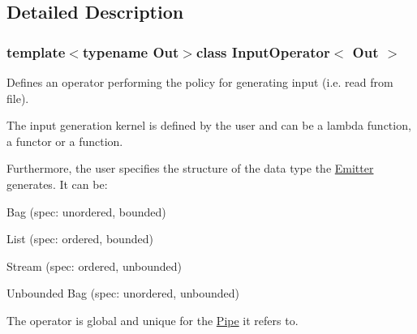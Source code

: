 \subsection{\-Detailed \-Description}
\subsubsection*{template$<$typename Out$>$class Input\-Operator$<$ Out $>$}

\-Defines an operator performing the policy for generating input (i.\-e. read from file).

\-The input generation kernel is defined by the user and can be a lambda function, a functor or a function.

\-Furthermore, the user specifies the structure of the data type the \hyperlink{class_emitter}{\-Emitter} generates. \-It can be\-:
\begin{DoxyItemize}
\item \-Bag (spec\-: unordered, bounded)
\item \-List (spec\-: ordered, bounded)
\item \-Stream (spec\-: ordered, unbounded)
\item \-Unbounded \-Bag (spec\-: unordered, unbounded)
\end{DoxyItemize}

\-The operator is global and unique for the \hyperlink{class_pipe}{\-Pipe} it refers to. 

